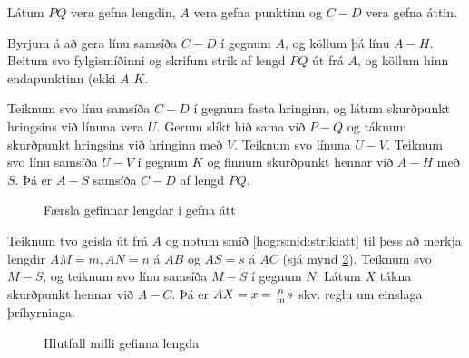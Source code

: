 \begin{frame}
  \begin{hogrsmid} \label{hogrsmid:strikiatt}
    Látum \(PQ\) vera gefna lengdin, \(A\) vera gefna punktinn og
    \(C-D\) vera gefna áttin.

    Byrjum á að gera línu samsíða \(C-D\) í gegnum \(A\), og köllum þá línu
    \(A-H\).
    Beitum svo fylgismíðinni og skrifum strik af lengd \(PQ\) út frá \(A\),
    og köllum hinn endapunktinn (ekki \(A\) \(K\).

    Teiknum svo línu samsíða \(C-D\) í gegnum fasta hringinn, og látum skurðpunkt hringsins
    við línuna vera \(U\). Gerum slíkt hið sama við \(P-Q\) og táknum skurðpunkt
    hringsins við hringinn með \(V\). Teiknum svo línuna \(U-V\). Teiknum
    svo línu samsíða \(U-V\) í gegnum \(K\) og finnum skurðpunkt hennar við
    \(A-H\) með \(S\). Þá er \(A-S\) samsíða \(C-D\) af lengd \(PQ\).
  \end{hogrsmid}
\end{frame}


\begin{frame}
  \begin{figure}[H]
    \centering
    \caption{Færsla gefinnar lengdar í gefna átt}
    \label{fig:gefinatt}
  \end{figure}
\end{frame}

\begin{frame}
  \begin{hogrsmid}[Finnum hlutfallið milli gefinna lengda n,m og s, x = \(\f{n}{m}s\)]\label{hogrsmid:hlutfall}
    Teiknum tvo geisla út frá \(A\)
    og  notum smíð \ref{hogrsmid:strikiatt}
    til þess að merkja lengdir \(AM =m, AN = n\) á \(AB\) og \(AS = s\) á \(AC\)
    (sjá mynd \ref{fig:hlutfall}). Teiknum svo \(M-S\), og teiknum svo
    línu samsíða \(M-S\) í gegnum \(N\). Látum \(X\) tákna skurðpunkt
    hennar við \(A-C\). Þá er \(AX = x = \frac{n}{m}{s}\) skv. reglu um einslaga þríhyrninga.
  \end{hogrsmid}
\end{frame}

\begin{frame}
  \begin{figure}[H]
    \centering
    \caption{Hlutfall milli gefinna lengda}
    \label{fig:hlutfall}
  \end{figure}
\end{frame}

